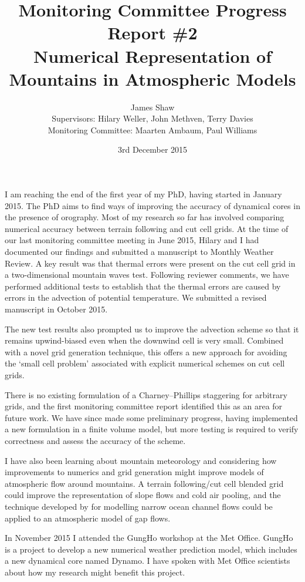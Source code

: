 \documentclass[a4paper]{article}
\title{Monitoring Committee Progress Report \#2\\
\vspace*{1em}
\Large{Numerical Representation of Mountains in Atmospheric Models}}
\author{James Shaw
\vspace{0.5em} \\
\large{Supervisors: Hilary Weller, John Methven, Terry Davies}
\vspace{0.5em} \\
\large{Monitoring Committee: Maarten Ambaum, Paul Williams}}
\date{3rd December 2015}
\begin{document}
\newcommand{\exner}{\Pi}
\newcommand{\TODO}[1]{\textcolor{purple}{TODO: \emph{#1}}}
\maketitle


I am reaching the end of the first year of my PhD, having started in January 2015.
The PhD aims to find ways of improving the accuracy of dynamical cores in the presence of orography.
Most of my research so far has involved comparing numerical accuracy between terrain following and cut cell grids.
At the time of our last monitoring committee meeting in June 2015, Hilary and I had documented our findings and submitted a manuscript to Monthly Weather Review.  A key result was that thermal errors were present on the cut cell grid in a two-dimensional mountain waves test.  Following reviewer comments, we have performed additional tests to establish that the thermal errors are caused by errors in the advection of potential temperature.  We submitted a revised manuscript in October 2015.

The new test results also prompted us to improve the advection scheme so that it remains upwind-biased even when the downwind cell is very small.  Combined with a novel grid generation technique, this offers a new approach for avoiding the `small cell problem' associated with explicit numerical schemes on cut cell grids.

There is no existing formulation of a Charney--Phillips staggering for arbitrary grids, and the first monitoring committee report identified this as an area for future work.  We have since made some preliminary progress, having implemented a new formulation in a finite volume model, but more testing is required to verify correctness and assess the accuracy of the scheme.

I have also been learning about mountain meteorology and considering how improvements to numerics and grid generation might improve models of atmospheric flow around mountains.  A terrain following/cut cell blended grid could improve the representation of slope flows and cold air pooling, and the technique developed by \citet{adcroft2013} for modelling narrow ocean channel flows could be applied to an atmospheric model of gap flows.

In November 2015 I attended the GungHo workshop at the Met Office.  GungHo is a project to develop a new numerical weather prediction model, which includes a new dynamical core named Dynamo.  I have spoken with Met Office scientists about how my research might benefit this project.
\end{document}
